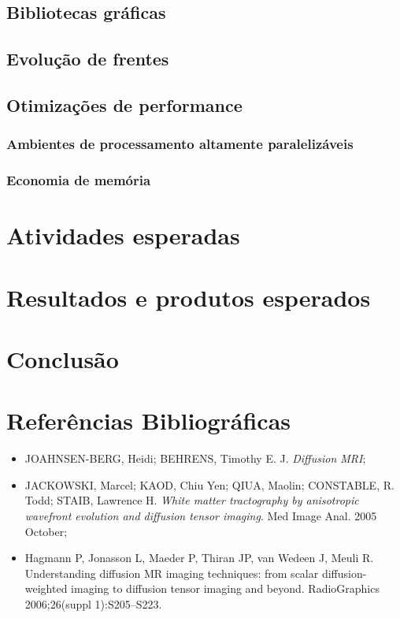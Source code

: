 \documentclass[a4paper,11pt]{report}
\begin{document}
  \section{Bibliotecas gráficas}
  
  \section{Evolução de frentes}
  
  
  \section{Otimizações de performance}
  
    \subsection{Ambientes de processamento altamente paralelizáveis}
    
    \subsection{Economia de memória}

\chapter{Atividades esperadas}

\chapter{Resultados e produtos esperados}

\chapter{Conclusão}

\chapter{Referências Bibliográficas}

\begin{itemize}
  \item JOAHNSEN-BERG, Heidi; BEHRENS, Timothy E. J. \textit{Diffusion MRI};
  \item JACKOWSKI, Marcel; KAOD, Chiu Yen; QIUA, Maolin; CONSTABLE, R. Todd; STAIB, Lawrence H. \textit{White matter tractography by anisotropic wavefront evolution and diffusion tensor imaging}. Med Image Anal. 2005 October;
  \item Hagmann P, Jonasson L, Maeder P, Thiran JP, van Wedeen J, Meuli R. Understanding diffusion MR imaging techniques: from scalar diffusion-weighted imaging to diffusion tensor imaging and beyond. RadioGraphics 2006;26(suppl 1):S205–S223.
\end{itemize}
\end{document}
